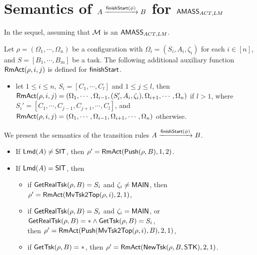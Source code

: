 
\section{Semantics of $A \xrightarrow{{\mathsf{finishStart} }(\phi)} B$ for {$\textsf{AMASS}_{ACT,LM}$}}\label{app-finishstart-lmaoamss}
In the sequel, assuming that ${\mathcal{M} }$ is an $\textsf{AMASS}_{ACT,LM}$.

Let $\rho = (\Omega_1,\cdots,\Omega_n)$ be a configuration with  $\Omega_i = (S_i, A_i, \zeta_i)$ for each $i\in[n]$, and $S=[B_1,\cdots,B_m]$ be a task. 
The following additional auxiliary function $\mathsf{RmAct}(\rho,i, j)$ is defined for ${\mathsf{finishStart} }$.
\begin{itemize}
    \item let $1 \le i \le n$, $S_i = [C_1, \cdots, C_l]$ and $1 \le j \le l$, then $\mathsf{RmAct}(\rho,i, j) = (\Omega_1,\cdots,\Omega_{i-1},(S_i',A_i,\zeta_i),\Omega_{i+1},\cdots,\Omega_n)$ if $l>1$, where $S_i' = [C_1,\cdots, C_{j-1}, C_{j+1},\cdots, C_l]$, and $\mathsf{RmAct}(\rho,i, j) = (\Omega_1,\cdots,\Omega_{i-1},\Omega_{i+1},\cdots,\Omega_n)$ otherwise.
\end{itemize}

We present the semantics of the transition rules $A \xrightarrow{{\mathsf{finishStart} }(\phi)} B$.

\smallskip
\noindent {}
	\begin{itemize}
		\item If ${\sf Lmd}(A) \neq {\sf SIT}$, then $\rho'= \mathsf{RmAct}(\mathsf{Push}(\rho,B), 1, 2)$.
		\item If ${\sf Lmd}(A) = {\sf SIT}$, then
    		\begin{itemize}
                \item if $\mathsf{GetRealTsk}(\rho,B) = S_i$ and $\zeta_i\neq{\sf MAIN}$, then $\rho'=\mathsf{RmAct}(\mathsf{MvTsk2Top}(\rho, i), 2, 1)$,
                \item if $\mathsf{GetRealTsk}(\rho,B) = S_i$ and $\zeta_i = {\sf MAIN}$, or $\mathsf{GetRealTsk}(\rho,B) = *\wedge \mathsf{GetTsk}(\rho,B) = S_i$, \\then $\rho'=\mathsf{RmAct}(\mathsf{Push}(\mathsf{MvTsk2Top}(\rho, i),B), 2, 1)$,
    			\item if $\mathsf{GetTsk}(\rho, B)=*$, then $\rho'= \mathsf{RmAct}(\mathsf{NewTsk}(\rho, B, {\sf STK}), 2, 1)$.
    		\end{itemize}
	\end{itemize}

